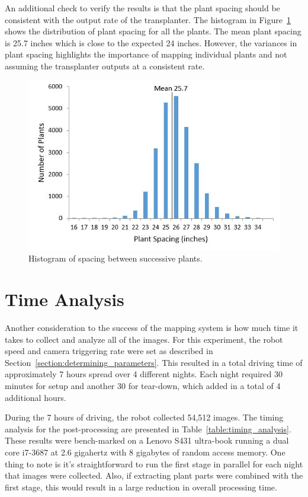 An additional check to verify the results is that the plant spacing should be consistent with the output rate of the transplanter.  The histogram in Figure~\ref{figure:plant_spacing} shows the distribution of plant spacing for all the plants.  The mean plant spacing is 25.7 inches which is close to the expected 24 inches. However, the variances in plant spacing highlights the importance of mapping individual plants and not assuming the transplanter outputs at a consistent rate.

\begin{figure}
	\centering
    \includegraphics[width=5in]{figures/plant_spacing.jpg}
    \caption[Plant spacing histogram]{Histogram of spacing between successive plants.}
    \label{figure:plant_spacing}
\end{figure}

\section{Time Analysis}

Another consideration to the success of the mapping system is how much time it takes to collect and analyze all of the images. For this experiment, the robot speed and camera triggering rate were set as described in Section~\ref{section:determining_parameters}.  This resulted in a total driving time of approximately 7 hours spread over 4 different nights.  Each night required 30 minutes for setup and another 30 for tear-down, which added in a total of 4 additional hours.  

During the 7 hours of driving, the robot collected 54,512 images.  The timing analysis for the post-processing are presented in Table~\ref{table:timing_analysis}. These results were bench-marked on a Lenovo S431 ultra-book running a dual core i7-3687 at 2.6 gigahertz with 8 gigabytes of random access memory.  One thing to note is it's straightforward to run the first stage in parallel for each night that images were collected.  Also, if extracting plant parts were combined with the first stage, this would result in a large reduction in overall processing time. 

